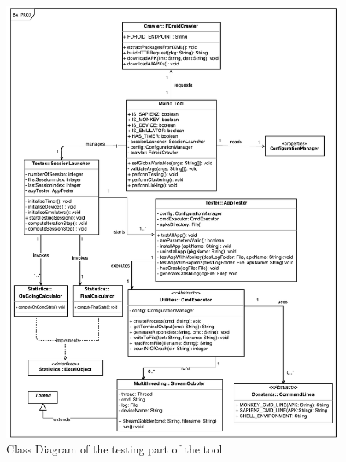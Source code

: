 \begin{figure}[tb]
\centering 
\includegraphics[width=\columnwidth]{diagrams/testing.pdf} 
\caption{Class Diagram of the testing part of the tool }
\label{testing}
\vspace{-3mm} 
\end{figure}


